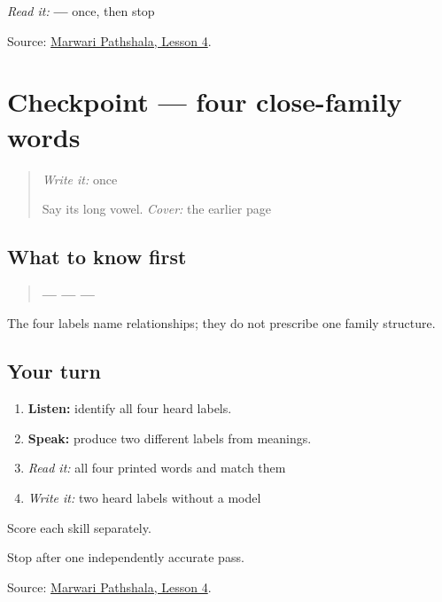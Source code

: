 \begin{tcolorbox}[breakable,colback=teal!4,colframe=teal!35!black,title={Before you move on}]
\emph{Read it:} \textbf{ — } once, then stop

Source: \href{https://www.marwaripathshala.com/marwari-lesson-4-english}{Marwari Pathshala, Lesson 4}.
\end{tcolorbox}
\section[Practice]{Checkpoint — four close-family words}

\label{lesson:MW-C08-family-four}



\begin{quote}
\emph{Write it:} \textbf{} once

Say its long vowel. \emph{Cover:} the earlier page
\end{quote}

\subsection*{What to know first}
\begin{quote}
\textbf{ —  —  — }
\end{quote}

The four labels name relationships; they do not prescribe one family structure.

\subsection*{Your turn}
\begin{enumerate}
\raggedright
  \item \textbf{Listen:} identify all four heard labels.
  \item \textbf{Speak:} produce two different labels from meanings.
  \item \emph{Read it:} all four printed words and match them
  \item \emph{Write it:} two heard labels without a model
\end{enumerate}

Score each skill separately.

\begin{tcolorbox}[breakable,colback=teal!4,colframe=teal!35!black,title={Before you move on}]
Stop after one independently accurate pass.

Source: \href{https://www.marwaripathshala.com/marwari-lesson-4-english}{Marwari Pathshala, Lesson 4}.
\end{tcolorbox}
